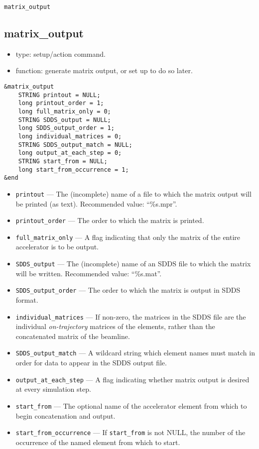 \documentclass[11pt]{article}
\begin{document}
\begin{latexonly}
\newpage
\begin{center}{\Large\verb|matrix_output|}\end{center}
\end{latexonly}
\subsection{matrix\_output \label{subsec:matrixoutput}}

\begin{itemize}
\item type: setup/action command.
\item function: generate matrix output, or set up to do so later.
\end{itemize}

\begin{verbatim}
&matrix_output
    STRING printout = NULL;
    long printout_order = 1;
    long full_matrix_only = 0;
    STRING SDDS_output = NULL;
    long SDDS_output_order = 1;
    long individual_matrices = 0;
    STRING SDDS_output_match = NULL;
    long output_at_each_step = 0;
    STRING start_from = NULL;
    long start_from_occurrence = 1;
&end
\end{verbatim}

\begin{itemize}
\item \verb|printout| --- The (incomplete) name of a file to which the 
matrix output will be printed (as text).  Recommended value: ``\%s.mpr''.
\item \verb|printout_order| --- The order to which the matrix is printed.
\item \verb|full_matrix_only| --- A flag indicating that only the matrix of
the entire accelerator is to be output.
\item \verb|SDDS_output| --- The (incomplete) name of an SDDS 
file to which the matrix will be written.  Recommended value: ``\%s.mat''.
\item \verb|SDDS_output_order| --- The order to which the matrix is output in SDDS format.
\item \verb|individual_matrices| --- If non-zero, the matrices in the SDDS file are the individual
{\em on-trajectory} matrices of the elements, rather than the concatenated matrix of the beamline.
\item \verb|SDDS_output_match| --- A wildcard string which element names must match in
order for data to appear in the SDDS output file.
\item \verb|output_at_each_step| --- A flag indicating whether matrix output
is desired at every simulation step.
\item \verb|start_from| --- The optional name of the accelerator element
from which to begin concatenation and output.
\item \verb|start_from_occurrence| --- If \verb|start_from| is not NULL, the
number of the occurrence of the named element from which to start.
\end{itemize}
\end{document}
